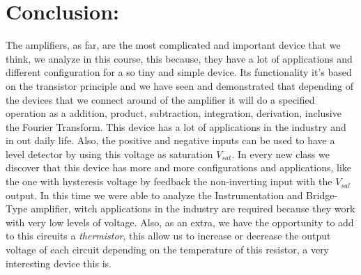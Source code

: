 \section{Conclusion:}

The amplifiers, as far, are the most complicated and important device that we think, we analyze in this course, this because, they have a lot of applications and different configuration for a so tiny and simple device. Its functionality it's based on the transistor principle and we have seen and demonstrated that depending of the devices that we connect around of the amplifier it will do a specified operation as a addition, product, subtraction, integration, derivation, inclusive the Fourier Transform. This device has a lot of applications in the industry and in out daily life. Also, the positive and negative inputs can be used to have a level detector by using this voltage as saturation $V_{sat}$. In every new class we discover that this device has more and more configurations and applications, like the one with hysteresis voltage by feedback the non-inverting input with the $V_{sal}$ output. In this time we were able to analyze the Instrumentation and Bridge-Type amplifier, witch applications in the industry are required because they work with very low levels of voltage. Also, as an extra, we have the opportunity to add to this circuits a {\itshape thermistor}, this allow us to increase or decrease the output voltage of each circuit depending on the temperature of this resistor, a very interesting device this is.

\pagebreak